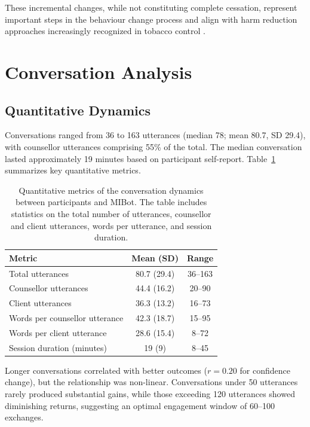These incremental changes, while not constituting complete cessation, represent important steps in the behaviour change process and align with harm reduction approaches increasingly recognized in tobacco control \citep{Abrams2018}.

\section{Conversation Analysis}
\label{sec:conversation-analysis}

\subsection*{Quantitative Dynamics}
\label{sec:conversation-dynamics}

Conversations ranged from 36 to 163 utterances (median 78; mean 80.7, SD 29.4), with counsellor utterances comprising 55\% of the total. The median conversation lasted approximately 19 minutes based on participant self-report. Table~\ref{table:conversation_metrics} summarizes key quantitative metrics.

\begin{table}[ht]
  \centering
  \small
  \setlength{\tabcolsep}{4pt}
  \renewcommand{\arraystretch}{1.1}
  \begin{tabular}{@{}lcc@{}}
    \toprule
    \textbf{Metric} & \textbf{Mean (SD)} & \textbf{Range} \\
    \midrule
    Total utterances & 80.7 (29.4) & 36--163 \\
    Counsellor utterances & 44.4 (16.2) & 20--90 \\
    Client utterances & 36.3 (13.2) & 16--73 \\
    Words per counsellor utterance & 42.3 (18.7) & 15--95 \\
    Words per client utterance & 28.6 (15.4) & 8--72 \\
    Session duration (minutes) & 19 (9) & 8--45 \\
    \bottomrule
  \end{tabular}
  \caption[Conversation Dynamics between Participants and MIBot: Quantitative Metrics]{Quantitative metrics of the conversation dynamics between participants and MIBot. The table includes statistics on the total number of utterances, counsellor and client utterances, words per utterance, and session duration.}
  \label{table:conversation_metrics}
\end{table}

Longer conversations correlated with better outcomes ($r=0.20$ for confidence change), but the relationship was non-linear. Conversations under 50 utterances rarely produced substantial gains, while those exceeding 120 utterances showed diminishing returns, suggesting an optimal engagement window of 60--100 exchanges.

